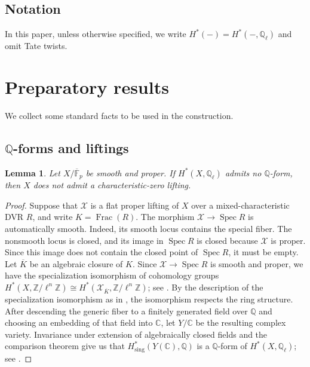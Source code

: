 \documentclass[11pt, reqno]{amsart}
\newtheorem{lemma}[theorem]{Lemma}
\theoremstyle{definition}
\newcommand\QQ{\mathbb{Q}}
\newcommand\CC{\mathbb{C}}
\newcommand\ZZ{\mathbb{Z}}
\newcommand\FF{\mathbb{F}}
\DeclareMathOperator{\et}{\acute{e}t}
\DeclareMathOperator{\Spec}{Spec}
\begin{document}
\subsection*{Notation}\;

In this paper, unless otherwise specified, we write $H^*(-)=H^*_{\et}(-,\QQ_\ell)$ and omit Tate twists.


\section{Preparatory results}\label{subsec: prep}

We collect some standard facts to be used in the construction. 

\subsection{$\QQ$-forms and liftings}
\label{subsubsec:Q-forms-and-liftings}
\;

\begin{lemma}
\label{lem:no-Q-form-obstructs-lifting}
Let $X/\overline{\FF}_p$ be smooth and proper.  If
$H^*_{\et}(X,\QQ_\ell)$ admits no $\QQ$-form, then $X$ does not admit a
characteristic-zero lifting.
\end{lemma}

\begin{proof}
Suppose that $\mathcal X$ is a flat proper lifting of $X$ over a
mixed-characteristic DVR $R$, and write $K=\operatorname{Frac}(R)$.
The morphism $\mathcal X\to\Spec R$ is automatically smooth.  Indeed,
its smooth locus contains the special fiber.  The nonsmooth locus is
closed, and its image in $\Spec R$ is closed because $\mathcal X$ is
proper.  Since this image does not contain the closed point of
$\Spec R$, it must be empty.
Let $\overline K$ be an algebraic closure of $K$.  Since $\mathcal X\to\Spec R$ is smooth and proper, we have the specialization isomorphism of cohomology groups
$H^*_{\et}(X,\ZZ/\ell^n\ZZ)
\cong
H^*_{\et}(\mathcal X_{\overline K},\ZZ/\ell^n\ZZ)$;
see \cite[VI, Corollary~4.2]{Milne-etale-cohomology}.
By the description of the specialization isomorphism as in \cite[\href{https://stacks.math.columbia.edu/tag/0GJ3}{Tag 0GJ3}]{stacks-project}, the isomorphism respects the ring structure.
After descending the generic fiber to a finitely generated field over
$\QQ$ and choosing an embedding of that field into $\CC$, let $Y/\CC$
be the resulting complex variety.  Invariance under extension of
algebraically closed fields and the comparison theorem give us that $H^*_{\mathrm{sing}}(Y(\CC),\QQ)$ is a $\QQ$-form of
$H^*_{\et}(X,\QQ_\ell)$; see
\cite[VI, Corollary~4.3 and III, Theorem~3.12]
{Milne-etale-cohomology}.
\end{proof}
\end{document}
